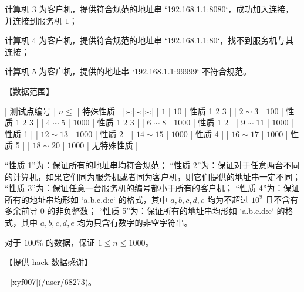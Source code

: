 \documentclass[12pt,twiside,a4paper]{ctexbook}
\numberwithin{chapter}{part}
\begin{document}
计算机 $3$ 为客户机，提供符合规范的地址串 `192.168.1.1:8080`，成功加入连接，并连接到服务机 $1$；

计算机 $4$ 为客户机，提供符合规范的地址串 `192.168.1.1:80`，找不到服务机与其连接；

计算机 $5$ 为客户机，提供的地址串 `192.168.1.1:99999` 不符合规范。

【数据范围】

| 测试点编号 | $n \le$ | 特殊性质 |
|:-:|:-:|:-:|
| $1$ | $10$ | 性质 1 2 3 |
| $2 \sim 3$ | $100$ | 性质 1 2 3 |
| $4 \sim 5$ | $1000$ | 性质 1 2 3 |
| $6 \sim 8$ | $1000$ | 性质 1 2 |
| $9 \sim 11$ | $1000$ | 性质 1 |
| $12 \sim 13$ | $1000$ | 性质 2 |
| $14 \sim 15$ | $1000$ | 性质 4 |
| $16 \sim 17$ | $1000$ | 性质 5 |
| $18 \sim 20$ | $1000$ | 无特殊性质 |

“性质 1”为：保证所有的地址串均符合规范；  
“性质 2”为：保证对于任意两台不同的计算机，如果它们同为服务机或者同为客户机，则它们提供的地址串一定不同；  
“性质 3”为：保证任意一台服务机的编号都小于所有的客户机；  
“性质 4”为：保证所有的地址串均形如 `a.b.c.d:e` 的格式，其中 $a, b, c, d, e$ 均为不超过 ${10}^9$ 且不含有多余前导 $0$ 的非负整数；  
“性质 5”为：保证所有的地址串均形如 `a.b.c.d:e` 的格式，其中 $a, b, c, d, e$ 均为只含有数字的非空字符串。

对于 $100 \%$ 的数据，保证 $1 \le n \le 1000$。

【提供 hack 数据感谢】  

- [xyf007](/user/68273)。
\end{document}
